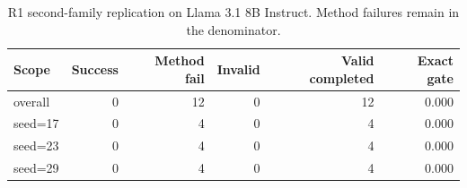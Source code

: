 \begin{table}[t]
\centering
\small
\begin{tabular}{lrrrrr}
\toprule
Scope & Success & Method fail & Invalid & Valid completed & Exact gate \\
\midrule
overall & 0 & 12 & 0 & 12 & 0.000 \\
seed=17 & 0 & 4 & 0 & 4 & 0.000 \\
seed=23 & 0 & 4 & 0 & 4 & 0.000 \\
seed=29 & 0 & 4 & 0 & 4 & 0.000 \\
\bottomrule
\end{tabular}
\caption{R1 second-family replication on Llama 3.1 8B Instruct. Method failures remain in the denominator.}
\end{table}
